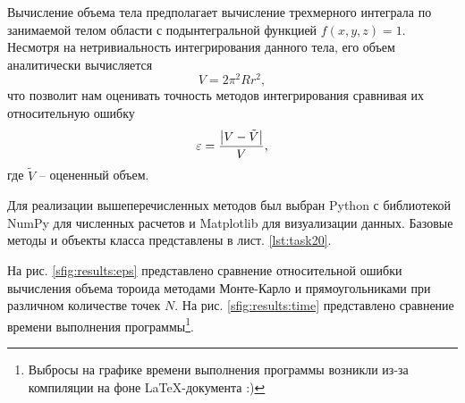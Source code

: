 Вычисление объема тела предполагает вычисление трехмерного интеграла по
занимаемой телом области с
подынтегральной функцией $f(x,y,z) = 1$. 
Несмотря на нетривиальность интегрирования данного тела, его объем аналитически
вычисляется
\begin{equation}
    \label{eq:}
    V = 2\pi^2 R r^2,
\end{equation}
что позволит нам оценивать точность методов интегрирования сравнивая их
относительную ошибку
\begin{equation}
    \label{eq:}
    \varepsilon = \frac{\abs{V-\tilde V}}{V},
\end{equation}
где $\tilde V$ -- оцененный объем.

Для реализации вышеперечисленных методов был выбран Python с библиотекой NumPy
для численных расчетов и Matplotlib для визуализации данных. Базовые методы и
объекты класса представлены в лист. \ref{lst:task20}. 


На рис. \ref{sfig:results:eps} представлено сравнение относительной ошибки
вычисления объема тороида методами Монте-Карло и прямоугольниками при различном
количестве точек $N$. На рис. \ref{sfig:results:time} представлено
сравнение времени выполнения программы\footnote{Выбросы на графике времени
выполнения программы возникли из-за компиляции на фоне \LaTeX-документа :)}.

